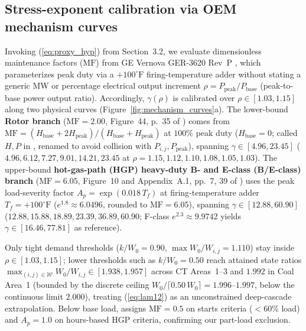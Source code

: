 \documentclass{elektr}
\begin{document}
\subsection{Stress-exponent calibration via OEM mechanism curves}
Invoking (\ref{eq:proxy_hyp}) from Section~3.2, we evaluate dimensionless maintenance factors ($\mathrm{MF}$) from GE Vernova GER-3620 Rev~P \cite{ger3620}, which parameterizes peak duty via a $+100^{\circ}\text{F}$ firing-temperature adder without stating a generic MW or percentage electrical output increment $\rho = P_{\mathrm{peak}}/P_{\mathrm{base}}$ (peak-to-base power output ratio). Accordingly, $\gamma(\rho)$ is calibrated over $\rho \in [1.03, 1.15]$ along two physical curves (Figure~\ref{fig:mechanism_curves}a). The lower-bound \textbf{Rotor branch} ($\mathrm{MF} = 2.00$, Figure~44, p.~35 of \cite{ger3620}) comes from $\mathrm{MF} = (H_{\mathrm{base}} + 2 H_{\mathrm{peak}})/(H_{\mathrm{base}} + H_{\mathrm{peak}})$ at $100\%$ peak duty ($H_{\mathrm{base}} = 0$; called $H, P$ in \cite{ger3620}, renamed to avoid collision with $P_{i,j}, P_{\mathrm{peak}}$), spanning $\gamma \in [4.96, 23.45]$ ($4.96, 6.12, 7.27, 9.01, 14.21, 23.45$ at $\rho = 1.15, 1.12, 1.10, 1.08, 1.05, 1.03$). The upper-bound \textbf{hot-gas-path (HGP) heavy-duty B- and E-class (B/E-class) branch} ($\mathrm{MF} = 6.05$, Figure~10 and Appendix~A.1, pp.~7, 39 of \cite{ger3620}) uses the peak load-severity factor $A_p = \exp(0.018\, T_f)$ at firing-temperature adder $T_f = +100^{\circ}\text{F}$ ($e^{1.8} \approx 6.0496$, rounded to $\mathrm{MF} = 6.05$), spanning $\gamma \in [12.88, 60.90]$ ($12.88, 15.88, 18.89, 23.39, 36.89, 60.90$; F-class $e^{2.3} \approx 9.9742$ yields $\gamma \in [16.46, 77.81]$ as reference).

Only tight demand thresholds ($k/W_0 = 0.90$, $\max W_0/W_{i,j} = 1.110$) stay inside $\rho \in [1.03, 1.15]$; lower thresholds such as $k/W_0 = 0.50$ reach attained state ratios $\max_{(i,j)\in\mathcal{W}} W_0/W_{i,j} \in [1.938, 1.957]$ across CT Areas~1--3 and $1.992$ in Coal Area~1 (bounded by the discrete ceiling $W_0/\lceil 0.50\,W_0\rceil = 1.996$--$1.997$, below the continuous limit $2.000$), treating (\ref{eq:lam12}) as an unconstrained deep-cascade extrapolation. Below base load, \cite{ger3620} assigns $\mathrm{MF} = 0.5$ on starts criteria ($<60\%$ load) and $A_p = 1.0$ on hours-based HGP criteria, confirming our part-load exclusion.
\end{document}
